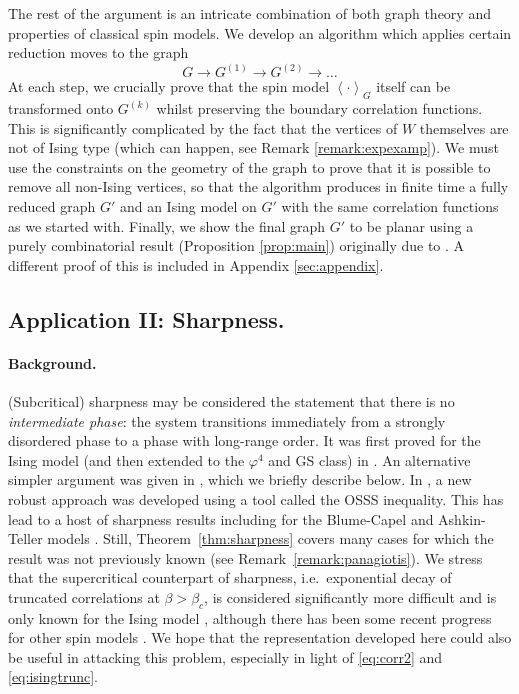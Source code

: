 \documentclass{article}
\numberwithin{equation}{section}
\theoremstyle{definition}
\theoremstyle{definition}
\theoremstyle{remark}
\newcommand\vp{\varphi}
\begin{document}
The rest of the argument is an intricate combination of both graph theory and properties of classical spin models. We develop an algorithm which applies certain reduction moves to the graph
\[
	G \to G^{(1)} \to G^{(2)} \to \ldots
\]
At each step, we crucially prove that the spin model $\left< \cdot \right>_{G}$ itself can be transformed onto $G^{(k)}$ whilst preserving the boundary correlation functions. This is significantly complicated by the fact that the vertices of $W$ themselves are not of Ising type (which can happen, see Remark \ref{remark:expexamp}). 
We must use the constraints on the geometry of the graph to prove that it is possible to remove all non-Ising vertices, so that the algorithm produces in finite time a fully reduced graph $G'$ and an Ising model on $G'$ with the same correlation functions as we started with.  
Finally, we show the final graph $G'$ to be planar using a purely combinatorial result (Proposition \ref{prop:main}) originally due to \cite{RobSey}. A different proof of this is included in Appendix \ref{sec:appendix}. 
\subsection{Application II: Sharpness.}\label{sec:app1}\mbox{}\par

\paragraph{Background. }(Subcritical) sharpness may be considered the statement that there is no \emph{intermediate phase}: the system transitions immediately from a strongly disordered phase to a phase with long-range order. %
It was first proved for the Ising model (and then extended to the $\vp^4$ and GS class) in \cite{ABF}. An alternative simpler argument was given in \cite{DCT}, which we briefly describe below. In \cite{duminil2019sharp}, a new robust approach was developed using a tool called the OSSS inequality. This has lead to a host of sharpness results including for the Blume-Capel and Ashkin-Teller models \cite{gunaratnam2024existence,aoun2024phase}. Still, Theorem~\ref{thm:sharpness} covers many cases for which the result was not previously known (see Remark~\ref{remark:panagiotis}). 
We stress that the supercritical counterpart of sharpness, i.e.~exponential decay of truncated correlations at $\beta > \beta_c$, is considered significantly more difficult and is only known for the Ising model \cite{duminil2020exponential}, although there has been some recent progress for other spin models \cite{GPPS2,gunaratnam2026supercriticalsharpnessrandomcluster}. We hope that the representation developed here could also be useful in attacking this problem, especially in light of \eqref{eq:corr2} and \eqref{eq:isingtrunc}. 
\end{document}
